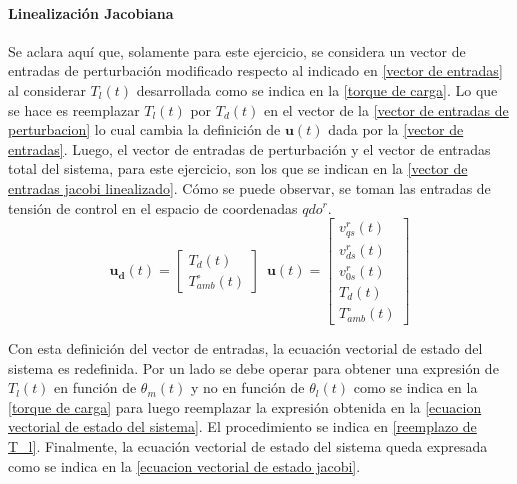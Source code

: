 \documentclass[a4paper, 10pt, onecolumn,journal]{ieeeconf}
\begin{document}
\paragraph{\textbf{Linealización Jacobiana}}
Se aclara aquí que, solamente para este ejercicio, se considera un vector de entradas de perturbación modificado
respecto al indicado en \cref{vector de entradas} al considerar $T_l(t)$ desarrollada como se indica en la \cref{torque de carga}.
Lo que se hace es reemplazar $T_l(t)$ por $T_d(t)$ en el vector de la \cref{vector de entradas de perturbacion} lo
cual cambia la definición de $\mathbf{u}(t)$ dada por la \cref{vector de entradas}. Luego, el vector
de entradas de perturbación y el vector de entradas total del sistema, para este ejercicio, son los que se indican en la \cref{vector de entradas jacobi linealizado}.
Cómo se puede observar, se toman las entradas de tensión de control en el espacio de coordenadas $qdo^r$.
\begin{equation}
    \mathbf{u_{d}}(t) = \begin{bmatrix} T_d(t) \\ T_{amb}^{\circ}(t)\end{bmatrix}\, \, \, 
    \mathbf{u}(t) = \begin{bmatrix} v^r_{qs}(t) \\ v^r_{ds}(t) \\ v^r_{0s}(t) \\ T_d(t) \\ T_{amb}^{\circ}(t) \end{bmatrix}
    \label{vector de entradas jacobi linealizado}
\end{equation}

Con esta definición del vector de entradas, la ecuación vectorial de estado del sistema es redefinida.
Por un lado se debe operar para obtener una expresión de $T_l(t)$ en función de $\theta_m(t)$ y no en función de 
$\theta_l(t)$ como se indica en la \cref{torque de carga} para luego reemplazar la expresión obtenida en la \cref{ecuacion vectorial de estado del sistema}.
El procedimiento se indica en \cref{reemplazo de T_l}. Finalmente, la ecuación vectorial de estado del sistema queda expresada
como se indica en la \cref{ecuacion vectorial de estado jacobi}.
\end{document}
